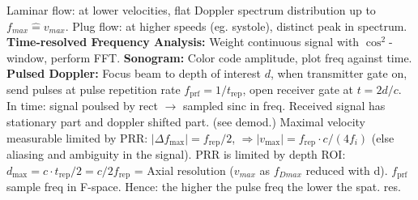 \documentclass[9pt]{article}
\begin{document}
\begin{multicols}{2}
Laminar flow: at lower velocities, flat Doppler spectrum distribution up to $f_{max} \hat{=} v_{max}$. Plug flow: at higher speeds (eg. systole), distinct peak in spectrum. \textbf{Time-resolved Frequency Analysis:}
Weight continuous signal with $\cos^2$-window, perform FFT. \textbf{Sonogram:}
Color code amplitude, plot freq against time.
\vspace{-0mm}
\textbf{Pulsed Doppler:} Focus beam to depth of interest $d$, when transmitter gate on, send pulses at pulse repetition rate $f_\mathrm{prf} = 1/t_\mathrm{rep}$, open receiver gate at $t=2d/c$. In time: signal poulsed by rect $\rightarrow$ sampled sinc in freq. Received signal has stationary part and doppler shifted part. (see demod.) Maximal velocity measurable limited by PRR: $|\Delta f_\mathrm{max}| = f_\mathrm{rep} / 2$, $\Rightarrow |v_\mathrm{max}| = f_\mathrm{rep} \cdot c/(4 f_i)$ (else aliasing and ambiguity in the signal). PRR is limited by depth ROI: $d_\mathrm{max} = c \cdot t_\mathrm{rep}/2 = c/2 f_\mathrm{rep}$ = Axial resolution ($v_{max}$ as $f_{Dmax}$ reduced with d). $f_\mathrm{prf}$ sample freq in F-space. Hence: the higher the pulse freq the lower the spat. res.


\end{multicols}
\end{document}
